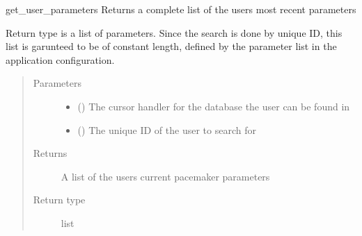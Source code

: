 \documentclass[letterpaper,10pt,english]{sphinxmanual}
\begin{document}
\begin{fulllineitems}
\label{\detokenize{index:data.database.get_user_parameters}}
get\_user\_parameters Returns a complete list of the users most recent parameters

Return type is a list of parameters. Since the search is done by unique ID,
this list is garunteed to be of constant length, defined by the parameter list
in the application configuration.
\begin{quote}\begin{description}
\item[{Parameters}] \leavevmode\begin{itemize}
\item {} 
 () \textendash{} The cursor handler for the database the user can be found in

\item {} 
 () \textendash{} The unique ID of the user to search for

\end{itemize}

\item[{Returns}] \leavevmode
A list of the users current pacemaker parameters

\item[{Return type}] \leavevmode
list

\end{description}\end{quote}

\end{fulllineitems}

\end{document}
